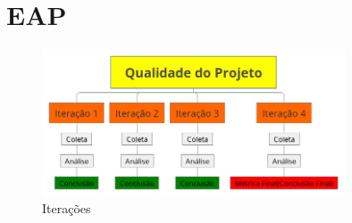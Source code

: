 \chapter{EAP}

\begin{figure}[H]
  \center
  \includegraphics[width=0.8\textwidth]{figuras/eap.png}
  \caption{Iterações}
  \label{fig:eap}
\end{figure}